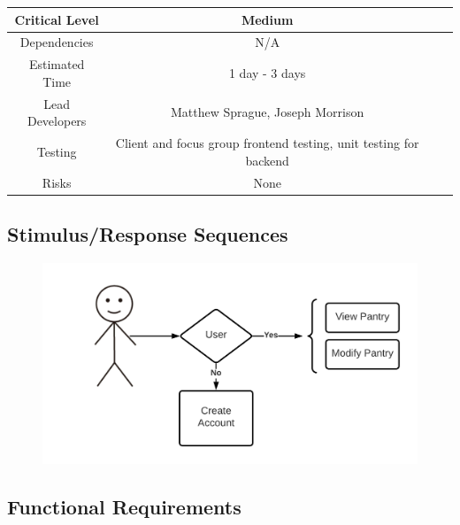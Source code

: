 \documentclass{scrreprt}
\begin{document}
\begin{center}
    \begin{tabular}{| c | c | c | c |}
        \hline
        Critical Level  & Medium                                                            \\
        \hline
        Dependencies    & N/A                                                               \\
        \hline
        Estimated Time  & 1 day - 3 days                                                    \\
        \hline
        Lead Developers & Matthew Sprague, Joseph Morrison                                  \\
        \hline
        Testing         & Client and focus group \gls{frontend} testing,
                          \gls{unit testing} for \gls{backend}                              \\
        \hline
        Risks           & None                                                              \\
        \hline
    \end{tabular}
\end{center}

\subsection{Stimulus/Response Sequences}

\begin{figure}[H]\centering
    \includegraphics[width=\columnwidth]{FlowCharts/Profile-Pantry.png}
\end{figure}

\subsection{\gls{Functional Requirements}}
\end{document}
